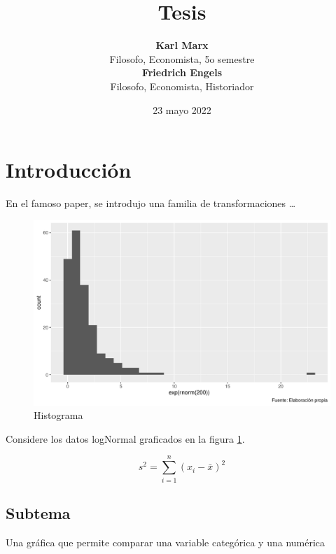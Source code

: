 \documentclass[12pt,spanish,a4paper,]{article}
\title{Tesis}
\author{\sf\Large\textbf{ Karl Marx}\\ {\sf\large Filosofo, Economista, 5o semestre\\[0.5cm]} \sf\Large\textbf{ Friedrich Engels}\\ {\sf\large Filosofo, Economista, Historiador\\[0.5cm]}}
\date{23 mayo 2022}
\makeatletter
\def\titlepage{\front{\expandafter{\@title}}{\@author}{\@organization}}
\makeatother
\begin{document}







{
\setcounter{tocdepth}{2}
\tableofcontents
}
\listoftablas
\listoffigures
\listofmapas
\newpage
{}
\setcounter{page}{1}
\hypertarget{introducciuxf3n}{%
\section{Introducción}\label{introducciuxf3n}}

En el famoso paper, \textcite{BC64} se introdujo una familia de transformaciones \dots

\begin{figure}
\centering
\includegraphics{skeleton_files/figure-latex/histogram-1.pdf}
\caption{\label{fig:histogram}Histograma}
\end{figure}

Considere los datos logNormal graficados en la figura \ref{fig:histogram}.

\[s^2 = \sum_{i=1}^n (x_i-\bar{x})^2\]

\hypertarget{subtema}{%
\subsection{Subtema}\label{subtema}}

Una gráfica que permite comparar una variable categórica y una numérica
\end{document}
